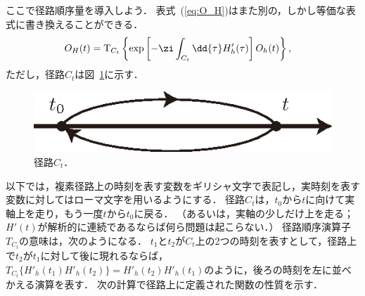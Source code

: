 \documentclass[a4paper,10pt]{jsarticle}
\begin{document}
ここで径路順序量を導入しよう．
表式~(\ref{eq:O_H})はまた別の，しかし等価な表式に書き換えることができる．
\begin{align}
O_H (t)
	& = \mathrm{T}_{C_t} \left\{ \exp \left[ - \zi \int_{C_t} \dd{\tau} H'_h (\tau) \right] O_h (t) \right\}
\label{eq:O_H_Ct}
,\end{align}
ただし，径路$C_t$は図~\ref{fig:4.1}に示す．
\begin{figure}[thbp]
\centering
\includegraphics[width=0.5\linewidth]{4.1.eps}
\caption{\label{fig:4.1}径路$C_t$．}
\end{figure}
以下では，複素径路上の時刻を表す変数をギリシャ文字で表記し，実時刻を表す変数に対してはローマ文字を用いるようにする．
径路$C_t$は，$t_0$から$t$に向けて実軸上を走り，もう一度$t$から$t_0$に戻る．
（あるいは，実軸の少しだけ上を走る；$H' (t)$が解析的に連続であるならば何ら問題は起こらない．）
径路順序演算子$T_{C_t}$の意味は，次のようになる．
$t_1$と$t_2$が$C_t$上の2つの時刻を表すとして，径路上で$t_2$が$t_1$に対して後に現れるならば，$T_{C_t} \{H'_h (t_1) H'_h (t_2)\} = H'_h (t_2) H'_h (t_1)$のように，後ろの時刻を左に並べかえる演算を表す．
次の計算で径路上に定義された関数の性質を示す．
\end{document}
